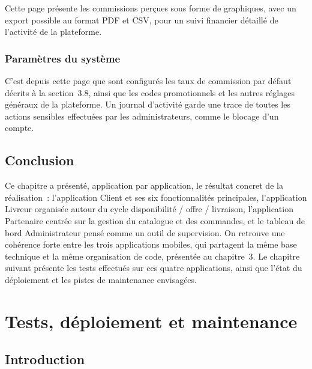 \documentclass[12pt,fleqn,a4paper]{report}
\begin{document}
\begin{justify}
Cette page présente les commissions perçues sous forme de graphiques, avec un export possible au format PDF et CSV, pour un suivi financier détaillé de l'activité de la plateforme.

\subsection{Paramètres du système}


C'est depuis cette page que sont configurés les taux de commission par défaut décrits à la section~3.8, ainsi que les codes promotionnels et les autres réglages généraux de la plateforme. Un journal d'activité garde une trace de toutes les actions sensibles effectuées par les administrateurs, comme le blocage d'un compte.

\section{Conclusion}

Ce chapitre a présenté, application par application, le résultat concret de la réalisation~: l'application Client et ses six fonctionnalités principales, l'application Livreur organisée autour du cycle disponibilité / offre / livraison, l'application Partenaire centrée sur la gestion du catalogue et des commandes, et le tableau de bord Administrateur pensé comme un outil de supervision. On retrouve une cohérence forte entre les trois applications mobiles, qui partagent la même base technique et la même organisation de code, présentée au chapitre~3. Le chapitre suivant présente les tests effectués sur ces quatre applications, ainsi que l'état du déploiement et les pistes de maintenance envisagées.

\chapter{Tests, déploiement et maintenance}

\section{Introduction}


\end{justify}
\end{document}
